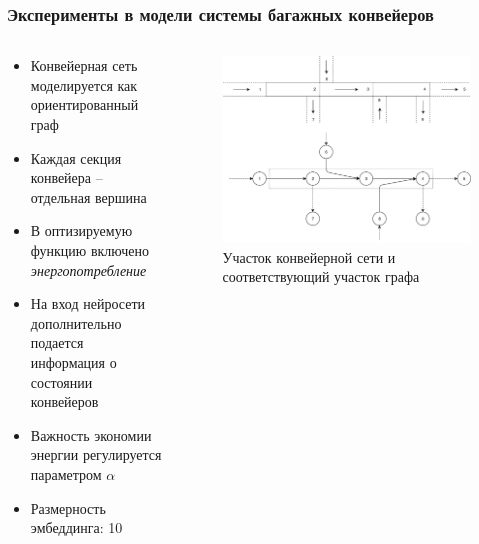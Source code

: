 \documentclass{beamer}
\begin{document}

\begin{frame}
  \frametitle{Эксперименты в модели системы багажных конвейеров}
  \begin{columns}
    \begin{column}{0.6\textwidth} 
      \begin{itemize}
      \item Конвейерная сеть моделируется как ориентированный граф
      \item Каждая секция конвейера -- отдельная вершина
      \item В оптизируемую функцию включено \textit{энергопотребление}
      \item На вход нейросети дополнительно подается информация о состоянии конвейеров
      \item Важность экономии энергии регулируется параметром $\alpha$
      \item Размерность эмбеддинга: 10
      \end{itemize}
    \end{column}
    \begin{column}{0.4\textwidth}
        \begin{figure}[!h]
          \centerline{\includegraphics[width=\textwidth]{belt-illustration}}
          \caption{Участок конвейерной сети и соответствующий участок графа}
        \end{figure}
    \end{column}
  \end{columns}
\end{frame}
\end{document}
